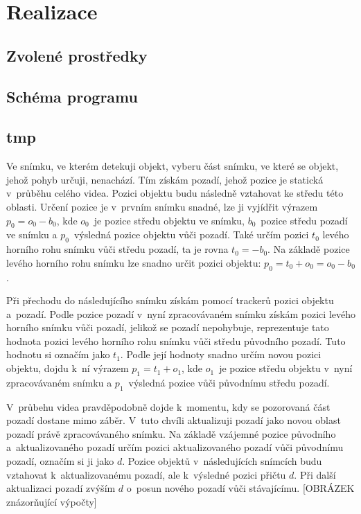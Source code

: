 \chapter{Realizace}
\label{chap:realizace}

\section{Zvolené prostředky}

\section{Schéma programu}



\section{tmp}

Ve snímku, ve kterém detekuji objekt, vyberu část snímku, ve které se objekt, jehož pohyb určuji, nenachází. Tím získám pozadí, jehož pozice je statická v~průběhu celého videa. Pozici objektu budu následně vztahovat ke středu této oblasti. Určení pozice je v~prvním snímku snadné, lze ji vyjídřit výrazem $p_0=o_0-b_0$, kde $o_0$~je pozice středu objektu ve snímku, $b_0$~pozice středu pozadí ve snímku a $p_0$~výsledná pozice objektu vůči pozadí. Také určím pozici $t_0$ levého horního rohu snímku vůči středu pozadí, ta je rovna $t_0=-b_0$. Na základě pozice levého horního rohu snímku lze snadno určit pozici objektu: $p_0=t_0+o_0=o_0-b_0$.

Při přechodu do následujícího snímku získám pomocí trackerů pozici objektu a~pozadí. Podle pozice pozadí v~nyní zpracovávaném snímku získám pozici levého horního snímku vůči pozadí, jelikož se pozadí nepohybuje, reprezentuje tato hodnota pozici levého horního rohu snímku vůči středu původního pozadí. Tuto hodnotu si označím jako $t_1$. Podle její hodnoty snadno určím novou pozici objektu, dojdu k~ní výrazem $p_1=t_1+o_1$, kde $o_1$~je pozice středu objektu v~nyní zpracovávaném snímku a $p_1$~výsledná pozice vůči původnímu středu pozadí.

V~průbehu videa pravděpodobně dojde k~momentu, kdy se pozorovaná část pozadí dostane mimo záběr. V~tuto chvíli aktualizuji pozadí jako novou oblast pozadí právě zpracovávaného snímku. Na základě vzájemné pozice původního a~aktualizovaného pozadí určím pozici aktualizovaného pozadí vůči původnímu pozadí, označím si ji jako $d$. Pozice objektů v~následujících snímcích budu vztahovat k~aktualizovanému pozadí, ale k~výsledné pozici přičtu $d$. Při další aktualizaci pozadí zvýším $d$ o~posun nového pozadí vůči stávajícímu. [OBRÁZEK znázorňující výpočty]

